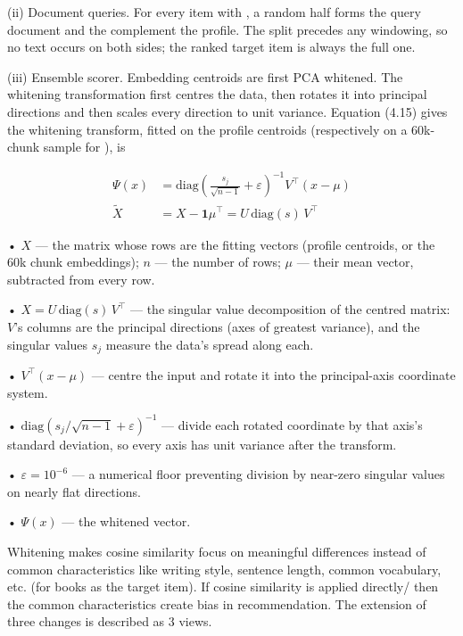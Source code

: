 (ii) Document queries. For every item with , a random half  forms the query document and the complement  the profile. The split precedes any windowing, so no text occurs on both sides; the ranked target item is always the full one.

(iii) Ensemble scorer. Embedding centroids are first PCA whitened. The whitening transformation first centres the data, then rotates it into principal directions and then scales every direction to unit variance. Equation (4.15) gives the whitening transform, fitted on the  profile centroids (respectively on a 60k-chunk sample for ), is

\begin{equation}
  \begin{aligned}
  \Psi(x) &= \text{diag}\!\left( \frac{s_{j}}{\sqrt{n-1}} + \varepsilon \right)^{-1} V^{\top}(x - \mu) \\
  \widetilde{X} &= X - \mathbf{1}\mu^{\top} = U \, \text{diag}(s) \, V^{\top}
  \end{aligned}
  \label{eq:ch4_4_15}
\end{equation}

• $X$ --- the matrix whose rows are the fitting vectors (profile centroids, or the 60k chunk embeddings); $n$ --- the number of rows; $\mu$ --- their mean vector, subtracted from every row.

• $X = U \, \text{diag}(s) \, V^\top$ --- the singular value decomposition of the centred matrix: $V$'s columns are the principal directions (axes of greatest variance), and the singular values $s_j$ measure the data's spread along each.

• $V^\top(x - \mu)$ --- centre the input and rotate it into the principal-axis coordinate system.

• $\text{diag}(s_j / \sqrt{n-1} + \varepsilon)^{-1}$ --- divide each rotated coordinate by that axis's standard deviation, so every axis has unit variance after the transform.

• $\varepsilon = 10^{-6}$ --- a numerical floor preventing division by near-zero singular values on nearly flat directions.

• $\Psi(x)$ --- the whitened vector.

Whitening makes cosine similarity focus on meaningful differences instead of common characteristics like writing style, sentence length, common vocabulary, etc. (for books as the target item). If cosine similarity is applied directly/ then the common characteristics create bias in recommendation. The extension of three changes is described as 3 views.

